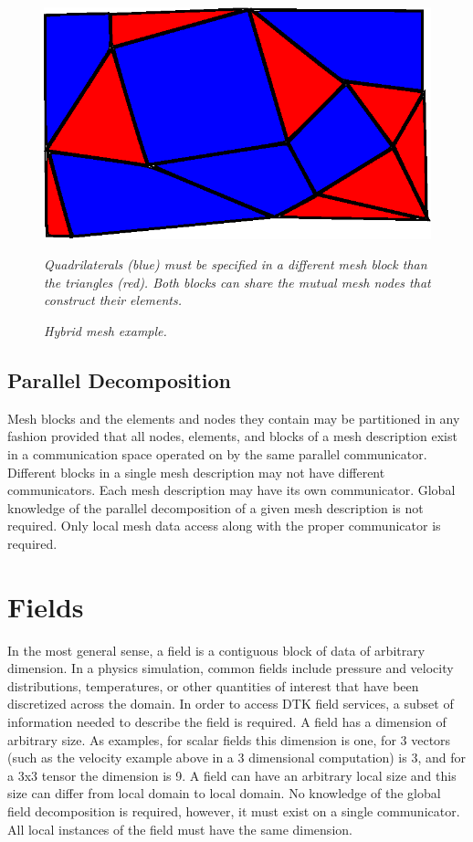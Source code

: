 \documentclass[letterpaper,12pt]{article}
\begin{document}
\begin{figure}[htpb!]
  \centering
  \includegraphics[width=5in]{hybrid_mesh.eps}
  \caption{\sl Hybrid mesh example.} {\sl Quadrilaterals (blue) must
    be specified in a different mesh block than the triangles
    (red). Both blocks can share the mutual mesh nodes that construct
    their elements.}
  \label{fig:hybrid_mesh}
\end{figure}

\subsection{Parallel Decomposition}\label{subsec:mesh_decomp}
Mesh blocks and the elements and nodes they contain may be partitioned
in any fashion provided that all nodes, elements, and blocks of a mesh
description exist in a communication space operated on by the same
parallel communicator. Different blocks in a single mesh description
may not have different communicators. Each mesh description may have
its own communicator. Global knowledge of the parallel decomposition
of a given mesh description is not required. Only local mesh data
access along with the proper communicator is required.

\clearpage

\section{Fields}\label{sec:field}
In the most general sense, a field is a contiguous block of data of
arbitrary dimension. In a physics simulation, common fields include
pressure and velocity distributions, temperatures, or other quantities
of interest that have been discretized across the domain. In order to
access DTK field services, a subset of information needed to describe
the field is required. A field has a dimension of arbitrary size. As
examples, for scalar fields this dimension is one, for 3 vectors (such
as the velocity example above in a 3 dimensional computation) is 3,
and for a 3x3 tensor the dimension is 9. A field can have an arbitrary
local size and this size can differ from local domain to local
domain. No knowledge of the global field decomposition is required,
however, it must exist on a single communicator. All local instances
of the field must have the same dimension.
\end{document}
